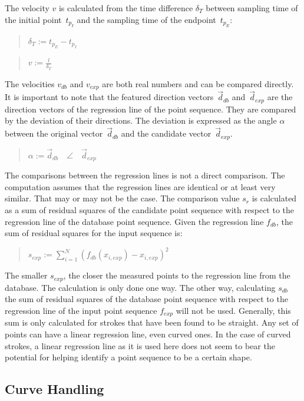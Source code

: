 The velocity \(v\) is calculated from the time 
difference \( \delta_T \) between sampling time of the initial point~\(t_{p_I}\) 
and the sampling time of the endpoint~\(t_{p_E}\):
\begin{quote}
\(
    \delta_T :=
        t_{p_E} - t_{p_I}
\)
\end{quote}
\begin{quote}
\(
    v := \frac{l}{\delta_T}
\)
\end{quote}
The velocities \(v_{db}\) and \(v_{exp}\) are both real numbers and can be 
compared directly.
It is important to note that the featured direction vectors~\(\vec{d}_{db}\) 
and~\(\vec{d}_{exp}\) are the direction vectors of the regression line of the
point sequence. They are compared by the deviation of their directions.
The deviation is expressed as the angle \( \alpha \) between the 
original vector~\(\vec{d}_{db}\) and the candidate vector~\(\vec{d}_{exp}\).
\begin{quote}
\(
    \alpha := \vec{d}_{db} \quad \angle \quad \vec{d}_{exp}
\)
\end{quote}
The comparisons between the regression lines is not a direct comparison.
The computation assumes that the regression lines are identical or at least 
very similar. That may or may not be the case.
The comparison value \(s_{r}\) is calculated as a sum of residual 
squares of the candidate point sequence with respect to the regression line 
of the database point sequence.
Given the regression line \(f_{db}\), the sum of residual squares for the 
input sequence is:
\begin{quote}
\(
    s_{exp} := \sum\limits_{i=1}^{N}{(f_{db}(x_{i,exp}) - x_{i,exp})^2}
\)
\end{quote}
The smaller \(s_{exp}\), the closer the measured points to the regression line
from the database. The calculation is only done one way. The other way,
calculating \(s_{db}\) the sum of residual squares of the database point sequence
with respect to the regression line of the input point sequence \(f_{exp}\)
will not be used.
Generally, this sum is only calculated for strokes that have been found
to be straight. Any set of points can have a linear regression line, 
even curved ones. In the case of curved strokes, a linear regression line as 
it is used here does not seem to bear the potential for helping identify a point 
sequence to be a certain shape.

\subsection{Curve Handling}
\label{sec:hwre:curvehandling}

